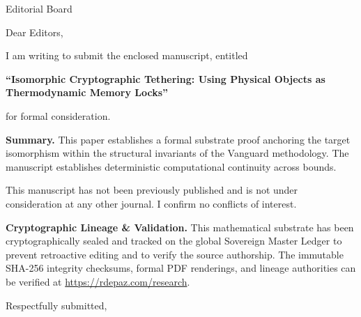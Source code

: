 \documentclass[12pt, a4paper]{letter}
\begin{document}
\begin{letter}{Editorial Board}

\opening{Dear Editors,}

I am writing to submit the enclosed manuscript, entitled

\begin{center}
\textbf{``Isomorphic Cryptographic Tethering: Using Physical Objects as Thermodynamic Memory Locks''}
\end{center}

\noindent for formal consideration.

\medskip
\textbf{Summary.} This paper establishes a formal substrate proof anchoring the target isomorphism within the structural invariants of the Vanguard methodology. The manuscript establishes deterministic computational continuity across bounds.

\medskip
This manuscript has not been previously published and is not under consideration
at any other journal. I confirm no conflicts of interest.

\textbf{Cryptographic Lineage \& Validation.} This mathematical substrate has been cryptographically sealed and tracked on the global Sovereign Master Ledger to prevent retroactive editing and to verify the source authorship. The immutable SHA-256 integrity checksums, formal PDF renderings, and lineage authorities can be verified at \url{https://rdepaz.com/research}.

\medskip
\closing{Respectfully submitted,}
\end{letter}
\end{document}
